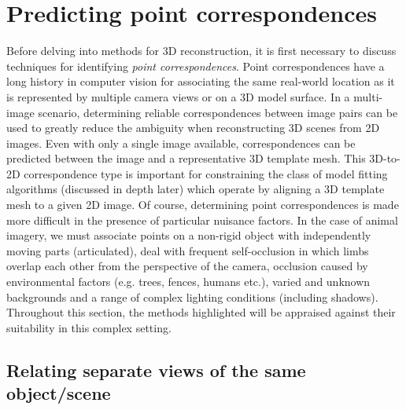 \section{Predicting point correspondences}

Before delving into methods for 3D reconstruction, it is first necessary to discuss techniques for identifying \emph{point correspondences}. Point correspondences have a long history in computer vision for associating the same real-world location as it is represented by multiple camera views or on a 3D model surface. In a multi-image scenario, determining reliable correspondences between image pairs can be used to greatly reduce the ambiguity when reconstructing 3D scenes from 2D images. Even with only a single image available, correspondences can be predicted between the image and a representative 3D template mesh. This 3D-to-2D correspondence type is important for constraining the class of model fitting algorithms (discussed in depth later) which operate by aligning a 3D template mesh to a given 2D image. Of course, determining point correspondences is made more difficult in the presence of particular nuisance factors. In the case of animal imagery, we must associate points on a non-rigid object with independently moving parts (articulated), deal with frequent self-occlusion in which limbs overlap each other from the perspective of the camera, occlusion caused by environmental factors (e.g. trees, fences, humans etc.), varied and unknown backgrounds and a range of complex lighting conditions (including shadows). Throughout this section, the methods highlighted will be appraised against their suitability in this complex setting.


\subsection{Relating separate views of the same object/scene}

